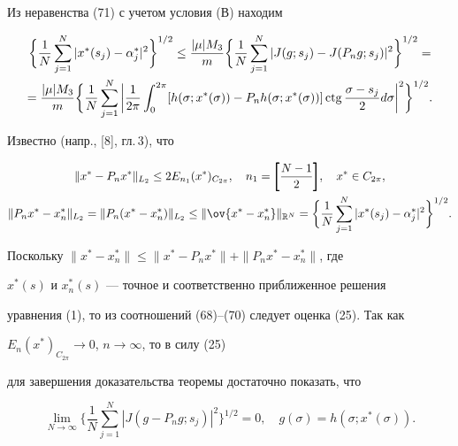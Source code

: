 Из неравенства (71) с учетом условия (В) находим


\begin{multline}


\biggl\{ \frac{1}{N}\sum_{j=1}^N|x^*(s_j)-\alpha_j^*|^2\biggr\}^{1/2}\leq


\frac{|\mu| M_3}{m}\biggl\{ \frac{1}{N}\sum_{j=1}^N| J(g;s_j)-


J(P_ng;s_j)|^2\biggr\}^{1/2}= \\


%


=\frac{|\mu| M_3}{m}\biggl\{ \frac{1}{N}\sum_{j=1}^N\bigg|\frac{1}{2\pi}


\int_0^{2\pi}[h(\sigma;x^*(\sigma))-P_nh(\sigma;x^*(\sigma))]


\ctg\frac{\sigma -s_j}{2}d\sigma\bigg|^2\biggr\}^{1/2}.


\end{multline}





Известно (напр., [8], гл.\,3), что


\begin{gather}


\|x^*-P_nx^*\|_{L_2}\leq 2 E_{n_1}(x^*)_{C_{2\pi}},\quad


n_1=\pmb{\bigg [}\frac{N-1}{2}\pmb{\bigg ]},\quad


x^*\in C_{2\pi}, \\


%


\|P_nx^*-x_n^*\|_{L_2}=\|P_n(x^*-x_n^*)\|_{L_2}\leq \|\ov{x^*-


x_n^*}\|_{\Bbb R^N}=\biggl\{\frac{1}{N}\sum_{j=1}^N|x^*(s_j)-\alpha_j^*|^2


\biggr\}^{1/2}.


\end{gather}





Поскольку $\|x^*-x_n^*\|\leq\|x^*-P_nx^*\|+\|P_nx^*-x_n^*\|$, где


$x^*(s)$ и $x_n^*(s)$ --- точное и соответственно приближенное решения


уравнения (1), то из соотношений (68)--(70) следует оценка (25). Так как


$E_n(x^*)_{C_{2\pi}}\rightarrow 0$, $n\rightarrow \infty$, то в силу (25)


для завершения доказательства теоремы достаточно показать, что


\begin{equation}


\lim_{N\rightarrow\infty}\biggl\{\frac{1}{N}\sum_{j=1}^N|J(g-P_ng;s_j)|^2


\biggr\}^{1/2}=0,\quad g(\sigma)=h(\sigma;x^*(\sigma)).


\end{equation}





